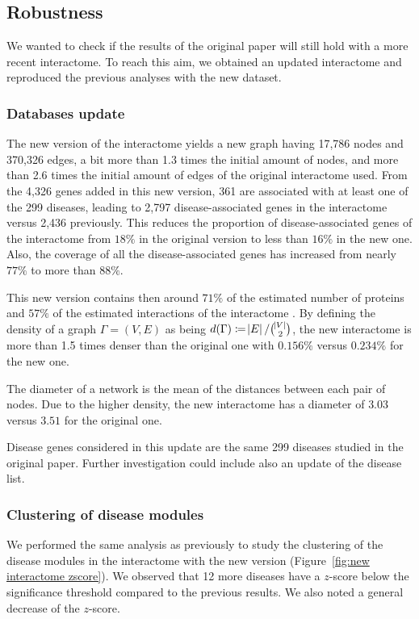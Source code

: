 \documentclass[letterpaper]{article}
\begin{document}
	\subsection{Robustness}
	We wanted to check if the results of the original paper will still hold with a more recent interactome.
	To reach this aim, we obtained an updated interactome and reproduced the previous analyses with the
	new dataset.

		\subsubsection{Databases update}
		The new version of the interactome yields a new graph having 17,786 nodes and 370,326 edges, a bit more
		than 1.3 times the initial amount of nodes, and more than 2.6 times the initial amount of edges of the
		original interactome used. From the 4,326 genes added in this new version, 361 are associated with at
		least one of the 299 diseases, leading to 2,797 disease-associated genes in the interactome versus 2,436
		previously. This reduces the proportion of disease-associated genes of the interactome from $18\%$ in
		the original version to less than $16\%$ in the new one. Also, the coverage of all the disease-associated
		genes has increased from nearly $77\%$ to more than $88\%$.

		This new version contains then around $71\%$ of the estimated number of proteins and $57\%$ of the
		estimated interactions of the interactome \citep{estimatingTheSizeOfTheHumanInteractome,ATruerMeasureOfOurIgnorance}.
		By defining the density of a graph $\Gamma = (V, E)$ as being $d(\Gamma) \coloneqq \abs E/\binom {\abs V}2$,
		the new interactome is more than 1.5 times denser than the original one with $0.156\%$ versus $0.234\%$
		for the new one.

		The diameter of a network is the mean of the distances between each pair of nodes. Due to the higher density,
		the new interactome has a diameter of $3.03$ versus $3.51$ for the original one.

		Disease genes considered in this update are the same 299 diseases studied in the original paper.
		Further investigation could include also an update of the disease list.

	\subsubsection{Clustering of disease modules}
	We performed the same analysis as previously to study the clustering of the disease modules in the
	interactome with the new version (Figure~\ref{fig:new interactome zscore}). We observed that 12 more
	diseases have a $z$-score below the significance threshold compared to the previous results. We also
	noted a general decrease of the $z$-score.
\end{document}
